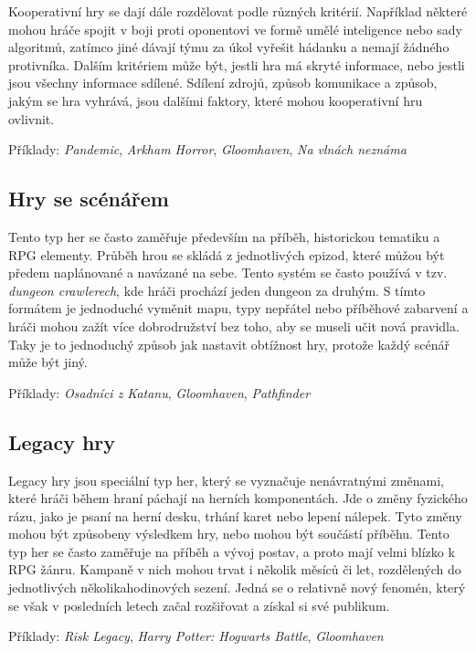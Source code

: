 Kooperativní hry se dají dále rozdělovat podle různých kritérií. Například některé mohou hráče spojit v boji proti oponentovi ve formě umělé inteligence nebo sady algoritmů, zatímco jiné dávají týmu za úkol vyřešit hádanku a nemají žádného protivníka. Dalším kritériem může být, jestli hra má skryté informace, nebo jestli jsou všechny informace sdílené. Sdílení zdrojů, způsob komunikace a způsob, jakým se hra vyhrává, jsou dalšími faktory, které mohou kooperativní hru ovlivnit.

Příklady: \textit{Pandemic}, \textit{Arkham Horror}, \textit{Gloomhaven}, \textit{Na vlnách neznáma}


\subsection{Hry se scénářem}
\label{subsec:scenario}

Tento typ her se často zaměřuje především na příběh, historickou tematiku a RPG elementy. Průběh hrou se skládá z jednotlivých epizod, které můžou být předem naplánované a navázané na sebe. Tento systém se často používá v tzv. \textit{dungeon crawlerech}, kde hráči prochází jeden dungeon za druhým. S tímto formátem je jednoduché vyměnit mapu, typy nepřátel nebo příběhové zabarvení a hráči mohou zažít více dobrodružství bez toho, aby se museli učit nová pravidla. Taky je to jednoduchý způsob jak nastavit obtížnost hry, protože každý scénář může být jiný.

Příklady: \textit{Osadníci z Katanu}, \textit{Gloomhaven}, \textit{Pathfinder}

\subsection{Legacy hry}
\label{subsec:legacy}

Legacy hry jsou speciální typ her, který se vyznačuje nenávratnými změnami, které hráči během hraní páchají na herních komponentách. Jde o změny fyzického rázu, jako je psaní na herní desku, trhání karet nebo lepení nálepek. Tyto změny mohou být způsobeny výsledkem hry, nebo mohou být součástí příběhu. Tento typ her se často zaměřuje na příběh a vývoj postav, a proto mají velmi blízko k RPG žánru. Kampaně v nich mohou trvat i několik měsíců či let, rozdělených do jednotlivých několikahodinových sezení. Jedná se o relativně nový fenomén, který se však v posledních letech začal rozšiřovat a získal si své publikum.

Příklady: \textit{Risk Legacy}, \textit{Harry Potter: Hogwarts Battle}, \textit{Gloomhaven}


